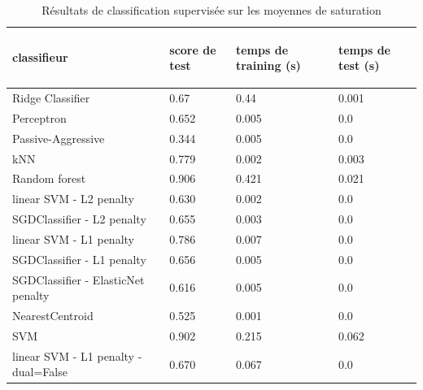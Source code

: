 \documentclass{book}
\begin{document}
\begin{table}
\begin{center}
\begin{tabular}{|p{5cm}|p{2cm}|p{2cm}|p{2cm}|}
\hline
\begin{bf}classifieur\end{bf}& \begin{bf}score de test\end{bf} & \begin{bf}temps de training (s)\end{bf} & \begin{bf}temps de test (s)\end{bf} \\
\hline
Ridge Classifier & 0.67 & 0.44 & 0.001\\
\hline
Perceptron &  0.652 & 0.005 & 0.0\\
\hline
Passive-Aggressive & 0.344 & 0.005 & 0.0\\
\hline
kNN & 0.779 & 0.002 & 0.003\\
\hline
Random forest & 0.906 & 0.421 & 0.021\\
\hline
linear SVM - L2 penalty & 0.630 & 0.002 & 0.0\\
\hline
SGDClassifier - L2 penalty & 0.655 & 0.003 & 0.0\\
\hline
linear SVM - L1 penalty	& 0.786 & 0.007 & 0.0\\
\hline
SGDClassifier - L1 penalty & 0.656 & 0.005 & 0.0\\
\hline
SGDClassifier - ElasticNet penalty & 0.616 & 0.005 & 0.0\\
\hline
NearestCentroid & 0.525 & 0.001 & 0.0\\
\hline
SVM & 0.902 & 0.215 & 0.062\\
\hline
linear SVM - L1 penalty - dual=False & 0.670 & 0.067 & 0.0\\
\hline
\end{tabular}
\end{center}
\caption{Résultats de classification supervisée sur les moyennes de saturation}
\label{Table_resultats_hue}
\end{table}
\end{document}
